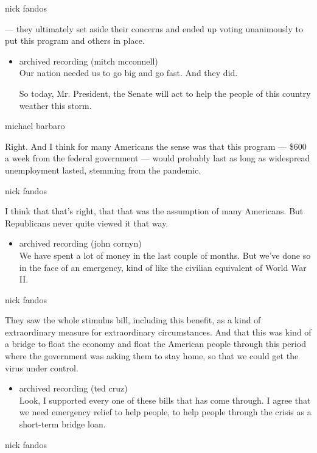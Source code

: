 nick fandos

--- they ultimately set aside their concerns and ended up voting
unanimously to put this program and others in place.

\begin{itemize}
\item
  archived recording (mitch mcconnell)\\
  Our nation needed us to go big and go fast. And they did.

  So today, Mr. President, the Senate will act to help the people of
  this country weather this storm.
\end{itemize}

michael barbaro

Right. And I think for many Americans the sense was that this program
--- \$600 a week from the federal government --- would probably last as
long as widespread unemployment lasted, stemming from the pandemic.

nick fandos

I think that that's right, that that was the assumption of many
Americans. But Republicans never quite viewed it that way.

\begin{itemize}
\tightlist
\item
  archived recording (john cornyn)\\
  We have spent a lot of money in the last couple of months. But we've
  done so in the face of an emergency, kind of like the civilian
  equivalent of World War II.
\end{itemize}

nick fandos

They saw the whole stimulus bill, including this benefit, as a kind of
extraordinary measure for extraordinary circumstances. And that this was
kind of a bridge to float the economy and float the American people
through this period where the government was asking them to stay home,
so that we could get the virus under control.

\begin{itemize}
\tightlist
\item
  archived recording (ted cruz)\\
  Look, I supported every one of these bills that has come through. I
  agree that we need emergency relief to help people, to help people
  through the crisis as a short-term bridge loan.
\end{itemize}

nick fandos

